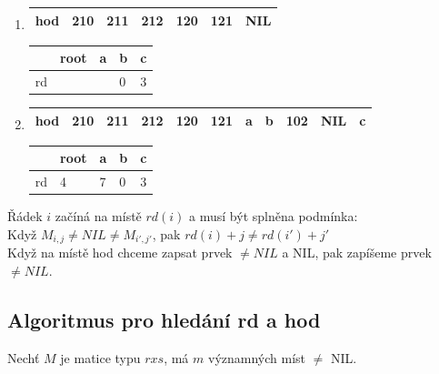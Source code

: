 \begin{enumerate}
\item
  \begin{tabular}{|l|llllll|}
  \hline
  hod & 210 & 211 & 212 & 120 & 121 & NIL \\
  \hline
  \end{tabular}
  
  \hspace{2mm}
  
  \begin{tabular}{|l|llll|}
  \hline
     & root & a & b & c \\
  \hline
  rd &      &   & 0 & 3 \\
  \hline
  \end{tabular}
  
  
\item  
  \begin{tabular}{|l|llllllllll|}
  \hline
  hod & 210 & 211 & 212 & 120 & 121 & a & b & 102 & NIL & c \\
  \hline
  \end{tabular}
  
  \hspace{2mm}
  
  \begin{tabular}{|l|llll|}
  \hline
     & root & a & b & c \\
  \hline
  rd & 4    & 7 & 0 & 3 \\
  \hline
  \end{tabular}
\end{enumerate} 

Řádek $i$ začíná na místě $rd(i)$ a musí být splněna podmínka: \\
Když $M_{i,j} \neq NIL \neq M_{i',j'}$, pak $rd(i) + j \neq rd(i') + j'$ \\
Když na místě hod chceme zapsat prvek $\neq NIL$ a NIL, pak zapíšeme prvek
$\neq NIL$.


\subsection{Algoritmus pro hledání rd a hod}

Nechť $M$ je matice typu $r x s$, má $m$ významných míst $\neq$ NIL.

